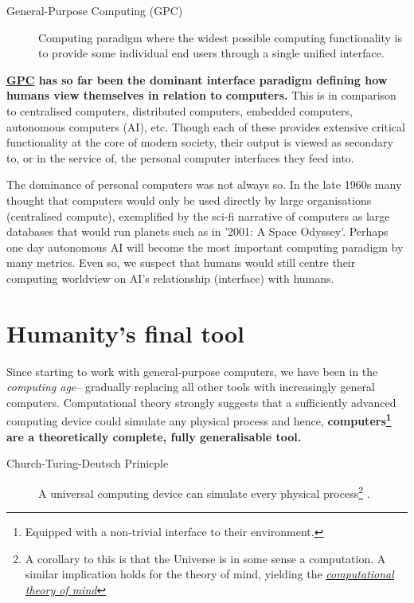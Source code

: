 \documentclass[logo,bsc,singlespacing,parskip]{infthesis}
\begin{document}
\begin{mdframed}
\begin{description}
\item[{\label{orgbaec896}General-Purpose Computing (\label{org6ef4753}GPC)}] Computing paradigm where the widest possible computing functionality is to provide some individual end users through a single unified interface.
\end{description}
\end{mdframed}

\textbf{\hyperref[org6ef4753]{GPC} has so far been the dominant interface paradigm defining how humans view themselves in relation to computers.}
This is in comparison to centralised computers, distributed computers, embedded computers, autonomous computers (AI), etc.
Though each of these provides extensive critical functionality at the core of modern society, their output is viewed as secondary to, or in the service of, the personal computer interfaces they feed into.

The dominance of personal computers was not always so.
In the late 1960s many thought that computers would only be used directly by large organisations (centralised compute), exemplified by the sci-fi narrative of computers as large databases that would run planets such as in '2001: A Space Odyssey'.
Perhaps one day autonomous AI will become the most important computing paradigm by many metrics.
Even so, we suspect that humans would still centre their computing worldview on AI's relationship (interface) with humans.

\section{Humanity's final tool}
\label{sec:org1c75149}
Since starting to work with general-purpose computers, we have been in the \emph{computing age}-- gradually replacing all other tools with increasingly general computers.
Computational theory strongly suggests that a sufficiently advanced computing device could simulate any physical process and hence, \textbf{computers\footnote{Equipped with a non-trivial interface to their environment.} are a theoretically complete, fully generalisable tool.}

\begin{mdframed}
\begin{description}
\item[{\label{org78bb90f}Church-Turing-Deutsch Prinicple}] A universal computing device can simulate every physical process\footnote{A corollary to this is that the Universe is in some sense a computation. A similar implication holds for the theory of mind, yielding the \emph{\hyperref[computational theory of mind]{computational theory of mind}}} \autocite{deutschQuantumTheoryChurchTuring1985}.
\end{description}
\end{mdframed}
\end{document}
